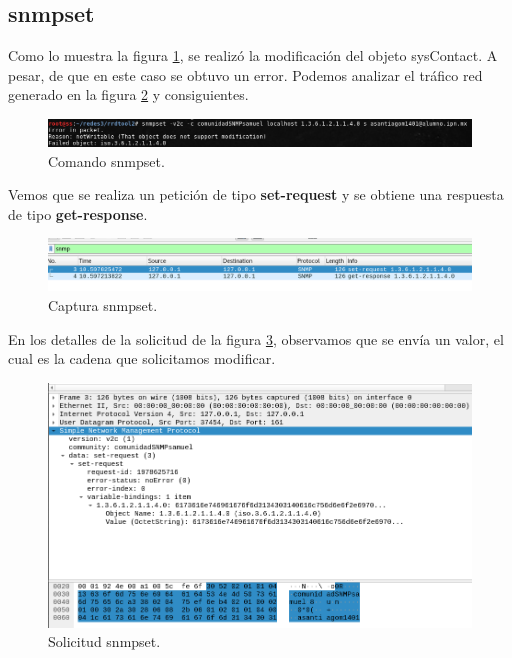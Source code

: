 \subsection{snmpset}

Como lo muestra la figura \ref{image:snmpset1}, se realizó la modificación del objeto sysContact. A pesar, de que en este caso se obtuvo un error. Podemos analizar el tráfico red generado en la figura \ref{image:snmpset2} y consiguientes.

\FloatBarrier
\begin{figure}[htbp!]
		\centering
			\includegraphics[width=.9 \textwidth]{images/snmpset1}
		\caption{Comando snmpset.}
		\label{image:snmpset1}
\end{figure}
\FloatBarrier

Vemos que se realiza un petición de tipo \textbf{set-request} y se obtiene una respuesta de tipo \textbf{get-response}.

\FloatBarrier
\begin{figure}[htbp!]
		\centering
			\includegraphics[width=.9 \textwidth]{images/snmpset2}
		\caption{Captura snmpset.}
		\label{image:snmpset2}
\end{figure}
\FloatBarrier

En los detalles de la solicitud de la figura \ref{image:snmpset3}, observamos que se envía un valor, el cual es la cadena que solicitamos modificar.

\FloatBarrier
\begin{figure}[htbp!]
		\centering
			\includegraphics[width=.9 \textwidth]{images/snmpset3}
		\caption{Solicitud snmpset.}
		\label{image:snmpset3}
\end{figure}
\FloatBarrier

